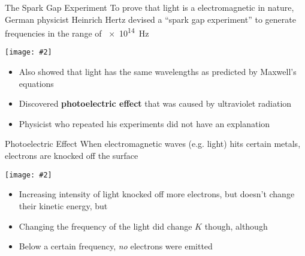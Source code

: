 \documentclass[12pt,compress,aspectratio=169]{beamer}
\newcommand{\pic}[2]{\texttt{[image: \#2]}}
\begin{document}
\begin{frame}{The Spark Gap Experiment}
  To prove that light is a electromagnetic in nature, German physicist Heinrich
  Hertz devised a ``spark gap experiment'' to generate frequencies in the range
  of
  \SI{e14}{\hertz}
  \begin{center}
    \vspace{-.1in}\pic{.5}{Hertz_exp_2.png}
  \end{center}
  \begin{itemize}
  \item\vspace{-.15in}Also showed that light has the same wavelengths as
    predicted by Maxwell's equations
  \item Discovered \textbf{photoelectric effect} that was caused by ultraviolet
    radiation
  \item Physicist who repeated his experiments did not have an explanation
  \end{itemize}
\end{frame}


\begin{frame}{Photoelectric Effect}
  When electromagnetic waves (e.g. light) hits certain metals, electrons are
  knocked off the surface

  \pic{1}{73bacc9f2bf571752483a89ef6c61a94f07470f7.png}
  \begin{itemize}
  \item Increasing intensity of light knocked off more electrons, but doesn't
    change their kinetic energy, but
  \item Changing the frequency of the light did change $K$ though, although
  \item Below a certain frequency, \emph{no} electrons were emitted
  \end{itemize}
\end{frame}
\end{document}
